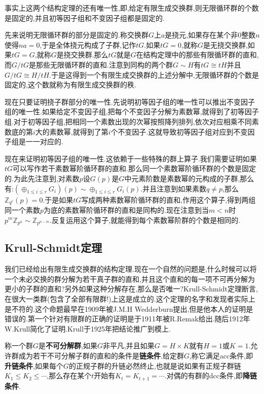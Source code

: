 事实上这两个结构定理的还有唯一性,即,给定有限生成交换群,则无限循环群的个数是固定的,并且初等因子组和不变因子组都是固定的.

先来说明无限循环群的部分是固定的.称交换群$G$上$a$是挠元,如果存在某个非0整数$n$使得$na=0$,于是全体挠元构成了子群,记作$tG$.如果$tG=0$,就称$G$是无挠交换群,如果$tG=G$,就称$G$是挠交换群.那么$tG$就是$G$在结构定理中的那些有限循环群的直和,而$G/tG$是那些无限循环群的直和.注意到同构的两个群$G\sim H$有$tG\cong tH$并且$G/tG\cong H/tH$.于是这得到一个有限生成交换群的上述分解中,无限循环群的个数是固定的,这个数就称为有限生成交换群的秩.

现在只要证明挠子群部分的唯一性.先说明初等因子组的唯一性可以推出不变因子组的唯一性.如果给定不变因子组,把每个不变因子分解为素数幂,就得到了初等因子组.对于初等因子组,把相同一个素数出现的次幂按照降列排列,依次对应相乘不同素数底的第$i$大的素数幂,就得到了第$i$个不变因子.这就导致初等因子组对应到不变因子组是一一对应的.

现在来证明初等因子组的唯一性.这依赖于一些特殊的群上算子.我们需要证明如果$tG$可以写作若干素数幂阶循环群的直和.那么同一个素数幂阶循环群的个数是固定的.为此先注意到,对素数$p$设$G(p)$是$G$中元素阶数是素数幂的元构成的子群,那么有:$(\oplus_{1\le i\le r}G_i)(p)\sim\oplus_{1\le i\le r}G_i(p)$.并且注意到如果素数$q\not=p$,那么$\mathbb{Z}_{q^r}(p)=0$.于是如果$tG$写成两种素数幂阶循环群的直和,作用这个算子,得到两组同一个素数$p$为底的素数幂阶循环群的直和是同构的.现在注意到当$m<n$时$p^m\mathbb{Z}_{p^n}\sim \mathbb{Z}_{p^{n-m}}$.反复运用这个算子,就能得到每个素数幂阶群的个数是相同的.
\newpage
\subsection{Krull-Schmidt定理}

我们已经给出有限生成交换群的结构定理.现在一个自然的问题是,什么时候可以将一个未必交换的群分解为若干真子群的直和,并且这个直和的每一项不可再分解为更小的子群的直和?另外如果这种分解存在,那么是否唯一?Krull-Schmidt定理断言,在很大一类群(包含了全部有限群!)上这是成立的.这个定理的名字和发现者实际上是不符的.这个命题最早在1909年被J.M.H Wedderburn提出,但是他本人的证明是错误的.第一个针对有限群的正确的证明是于1911年被R.Remak给出.随后1912年W.Krull简化了证明.Krull于1925年把结论推广到模上.

称一个群$G$是\textbf{不可分解群},如果$G$非平凡,并且如果$G=H\times K$就有$H=1$或$K=1$.允许群成为若干不可分解子群的直和的条件是\textbf{链条件}.给定群$G$,称它满足acc条件,即\textbf{升链条件},如果每个$G$的正规子群的升链必然终止,也就是说如果有正规子群链$K_1\le K_2\le\cdots$,那么存在某个$t$开始有$K_t=K_{t+1}=\cdots$.对偶的有群的dcc条件,即\textbf{降链条件}.

